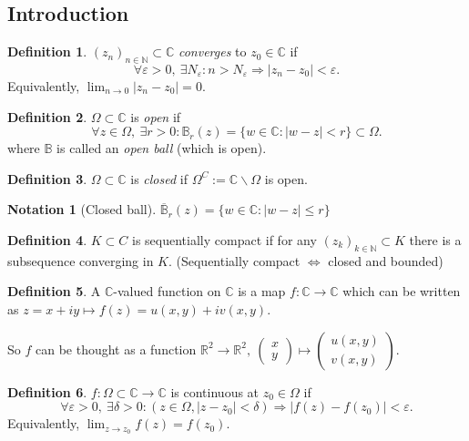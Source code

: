 \documentclass[a4paper]{article}
\theoremstyle{definition}
\newtheorem{defn}{Definition}[subsection]
\newtheorem*{notation}{Notation}
\begin{document}
\subsection{Introduction}
\begin{defn}
$(z_n)_{n\in \mathbb N} \subset \mathbb C$ \textit{converges} to $z_0 \in \mathbb C$ if
\[
\forall \varepsilon >0, \ \exists N_\varepsilon : n>N_\varepsilon \Rightarrow |z_n-z_0|<\varepsilon .
\]
Equivalently, $\displaystyle \lim_{n\rightarrow 0} |z_n-z_0|=0$.
\end{defn}

\begin{defn}
$\Omega \subset \mathbb C$ is \textit{open} if
\[
\forall z\in \Omega,\ \exists r>0: \mathbb B_r(z) = \{w\in \mathbb C:|w-z|<r\} \subset \Omega .
\]
where $\mathbb B$ is called an \textit{open ball} (which is open).
\end{defn}
\begin{defn}
$\Omega \subset \mathbb C$ is \textit{closed} if $\Omega^C := \mathbb C \backslash \Omega$ is open.
\end{defn}
\begin{notation}[Closed ball]
$\overline{\mathbb B}_r(z) = \{w\in \mathbb C:|w-z|\leq r\}$
\end{notation}
\begin{defn}
$K\subset C$ is sequentially compact if for any $(z_k)_{k\in \mathbb N} \subset K$ there is a subsequence converging in $K$. (Sequentially compact $\Leftrightarrow$ closed and bounded)
\end{defn}

\begin{defn}
A $\mathbb C$-valued function on $\mathbb C$ is a map $f:\mathbb C \rightarrow \mathbb C$ which can be written as $z=x+iy \mapsto f(z)=u(x,y) + iv(x,y)$.

So $f$ can be thought as a function $\mathbb R^2 \rightarrow \mathbb R^2,\ \begin{pmatrix}x\\y\end{pmatrix} \mapsto \begin{pmatrix} u(x,y) \\ v(x,y) \end{pmatrix}$.
\end{defn}

\begin{defn}
$f:\Omega \subset \mathbb C \rightarrow \mathbb C$ is continuous at $z_0 \in \Omega$ if
\[
\forall \varepsilon >0, \ \exists \delta >0 : \left( z\in \Omega, |z-z_0|<\delta \right) \Rightarrow |f(z)-f(z_0)| < \varepsilon .
\]
Equivalently, $\displaystyle \lim_{z\rightarrow z_0} f(z) = f(z_0)$.
\end{defn}
\end{document}
